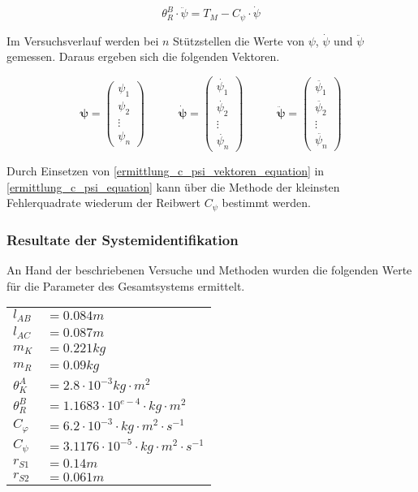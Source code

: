 \begin{equation}
\label{ermittlung_c_psi_equation}
\theta^B_R \cdot \ddot{\psi} = T_M - C_\psi \cdot \dot{\psi}
\end{equation}

Im Versuchsverlauf werden bei $n$ Stützstellen die Werte von $\psi$, $\dot{\psi}$ und $\ddot{\psi}$ gemessen. Daraus ergeben sich die folgenden Vektoren.

\begin{equation}
\label{ermittlung_c_psi_vektoren_equation}
\boldsymbol{\psi} = \begin{pmatrix} \psi_1 \\ \psi_2 \\ \vdots \\ \psi_n \end{pmatrix} \hspace{35pt}
\boldsymbol{\dot{\psi}} = \begin{pmatrix}
\dot{\psi_1} \\ \dot{\psi_2} \\ \vdots \\ \dot{\psi_n}
\end{pmatrix} \hspace{35pt}
\boldsymbol{\ddot{\psi}} = \begin{pmatrix}
\ddot{\psi_1} \\ \ddot{\psi_2} \\ \vdots \\ \ddot{\psi_n}
\end{pmatrix}
\end{equation}

Durch Einsetzen von \ref{ermittlung_c_psi_vektoren_equation} in \ref{ermittlung_c_psi_equation} kann über die Methode der kleinsten Fehlerquadrate wiederum der Reibwert $C_\psi$ bestimmt werden.

\subsubsection{Resultate der Systemidentifikation}
An Hand der beschriebenen Versuche und Methoden wurden die folgenden Werte für die Parameter des Gesamtsystems ermittelt.

\begin{table}[h]
\centering
\begin{tabular}{ll}
	$l_{AB}$ & $=0.084m$\\
	$l_{AC}$ & $=0.087m$ \\
	$m_K$ & $=0.221kg$ \\
	$m_R$ & $=0.09kg$ \\
	${\theta}^A_K$ & $=2.8 \cdot 10^{-3}kg \cdot m^2$ \\
	${\theta}^B_R$ & $=1.1683 \cdot 10^{e-4} \cdot kg \cdot m^2$ \\
	$C_{\varphi}$ & $= 6.2 \cdot 10^{-3} \cdot kg \cdot m^2 \cdot s^{-1}$ \\
	$C_{\psi}$ & $= 3.1176 \cdot 10^{-5} \cdot kg \cdot m^2 \cdot s^{-1}$ \\
	$r_{S1}$ & $=0.14m$ \\
	$r_{S2}$ & $=0.061m$ \\
\end{tabular}
\end{table}

